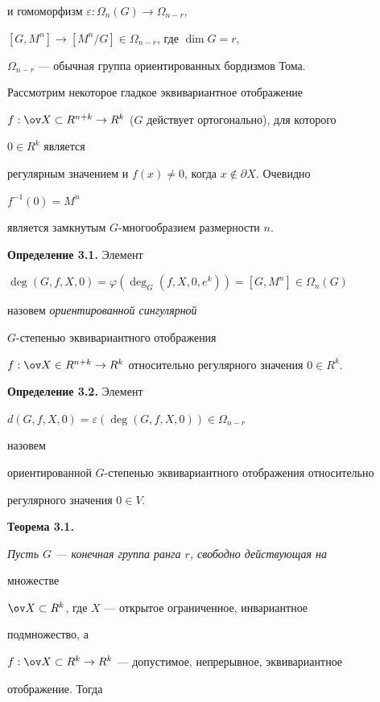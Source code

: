 и гомоморфизм $\varepsilon:\Omega_n(G)\to\Omega_{n-r}$, 


$[G,M^n]\to[M^n/G]\in\Omega_{n-r}$, где $\dim G=r$, 


$\Omega_{n-r}$ --- обычная группа ориентированных бордизмов Тома. 


 


Рассмотрим некоторое гладкое эквивариантное отображение 


$f:\ov X\subset R^{n+k}\to R^k$ ($G$ действует ортогонально), для которого 


$0\in R^k$ является 


регулярным значением и $f(x)\ne0$, когда $x\notin\partial X$. Очевидно 


$f^{-1}(0)=M^n$ 


является замкнутым $G$-многообразием размерности $n$. 


\medskip 


 


{\bf Определение 3.1.} Элемент 


$\deg(G,f,X,0)=\varphi(\deg_G(f,X,0,e^k))=[G,M^n]\in\Omega_n(G)$ 


назовем {\it ориентированной сингулярной} 


$G$-степенью эквивариантного отображения 


$f:\ov X\in R^{n+k}\to R^k$ относительно регулярного значения $0\in R^k$. 


\medskip 


 


{\bf Определение 3.2.} Элемент 


$d(G,f,X,0)=\varepsilon(\deg(G,f,X,0))\in\Omega_{n-r}$ 


назовем 


ориентированной $G$-степенью эквивариантного отображения относительно 


регулярного значения $0\in V$. 


\medskip 


 


{\bf Теорема 3.1.} 


{\it Пусть $G$ --- конечная группа ранга $r$, свободно действующая на 


множестве 


$\ov X\subset R^k$, где $X$ --- открытое ограниченное, инвариантное 


подмножество, а 


$f:\ov X\subset R^k\to R^k$ --- допустимое, непрерывное, эквивариантное 


отображение. Тогда} 


